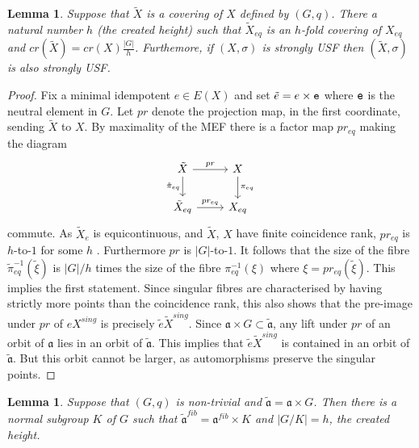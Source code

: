\documentclass[12pt]{amsart}
\newtheorem{lemma}[theorem]{Lemma}
\theoremstyle{definition}
\numberwithin{equation}{section}
\newcommand{\Xe}{X_{eq}}
\newcommand{\aut}{{\mathfrak a}}
\newcommand{\pe}{\pi_{eq}}
\begin{document}
\begin{lemma} Suppose that $\tilde X$ is a covering of $X$ defined by $(G,q)$.  There a natural number $h$ (the created height) such that 
$ \tilde X_{eq}$ is an $h$-fold covering of $\Xe$ and $ cr(\tilde X) = cr (X)\frac{|G|}{h} $.
Furthemore, if $(X,\sigma)$ is strongly USF then $(\tilde X,\sigma)$ is also strongly USF.
\end{lemma}
\begin{proof} 
Fix a minimal idempotent $e\in E(X)$ and set $\tilde e = e\times \tt{e}$  where $\tt{e}$ is the neutral element in $G$.   
Let $pr$ denote the projection map, in the first coordinate, sending $\tilde X$ to $X$.
By maximality of the MEF there is a factor map $pr_{eq}$ making 
the  diagram 
\[
\begin{tikzcd}
\tilde X \arrow{r}{pr} \arrow[swap]{d}{\tilde \pi_{eq}} & X \arrow{d}{\pe} \\
\tilde X_{eq}\arrow{r}{pr_{eq}}  & \Xe
\end{tikzcd}
\]
commute.
As $\tilde X_e$ is equicontinuous, and $\tilde X$, $X$ have finite coincidence rank, ${pr_{eq}} $ is $h$-to-$1$ for some $h$  \cite{Sacker-Sell:1974}. Furthermore $pr$ is $|G|$-to-$1$. It follows that the size of the fibre $\tilde\pi_{eq}^{-1}(\tilde \xi)$ is $|G|/h$ times the size of the fibre $\pe^{-1}(\xi)$ where $\xi = pr_{eq}(\tilde \xi)$. This implies the first statement. Since singular fibres are characterised by having strictly more points than the coincidence  rank, this also shows that the pre-image under $pr$ of $eX^{sing}$ is precisely $\tilde e \tilde X^{sing}$. Since $\aut\times G\subset \tilde\aut$, any lift under $pr$ of an orbit of $\aut$ lies in an orbit of $\tilde\aut$.  This implies that $\tilde e \tilde X^{sing}$ is contained in an orbit of $\tilde\aut$. But this orbit cannot be larger, as automorphisms preserve the singular points. 
\end{proof}
\begin{lemma}\label{lem-K}
Suppose that $(G,q)$ is non-trivial and $\tilde\aut = \aut\times G$. Then there is a normal subgroup $K$ of $G$ such that $\tilde\aut^{fib} = \aut^{fib}\times K$ and $|G/K| = h$, the created height.   
\end{lemma}
\end{document}
